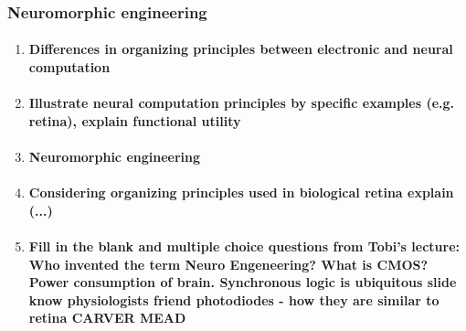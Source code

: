 \documentclass[12pt,article,oneside,a4paper]{memoir}
\begin{document}
\subsubsection{Neuromorphic engineering}
\begin{enumerate}
\item \paragraph{Differences in organizing principles between electronic and neural computation}
\item \paragraph{Illustrate neural computation principles by specific examples (e.g. retina), explain functional utility}
\item \paragraph{Neuromorphic engineering}
\item \paragraph{Considering organizing principles used in biological retina explain (...)}
\item \paragraph{Fill in the blank and multiple choice questions from Tobi's lecture: Who invented the term Neuro Engeneering? What is CMOS? Power consumption of brain. Synchronous logic is ubiquitous slide know physiologists friend photodiodes - how they are similar to retina CARVER MEAD}
\end{enumerate}

\end{document}
